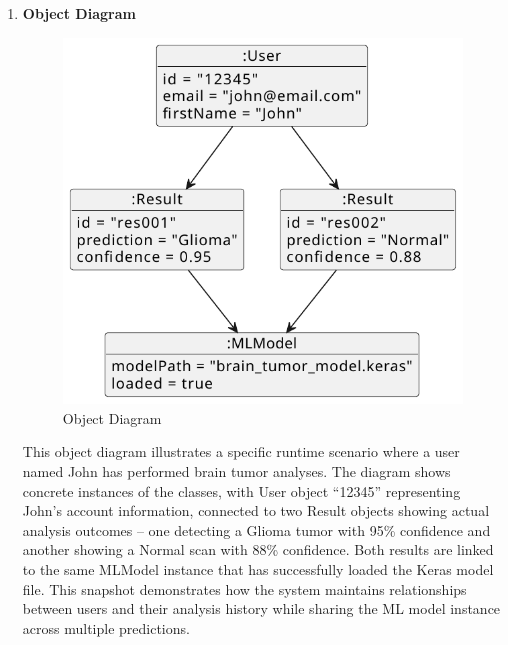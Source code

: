 \begin{enumerate}[label=\roman*.]
    \item \textbf{Object Diagram}
          \begin{center}
              \begin{figure}[H]
                  \centering
                  \includegraphics[width=0.60\linewidth]{Images/Highlevel/object.pdf}
                  \caption{Object Diagram}
                  \label{fig:ObjectDiagram}
              \end{figure}
          \end{center}
          This object diagram illustrates a specific runtime scenario where a user named John has performed brain tumor analyses. The diagram shows concrete instances of the classes, with User object ``12345'' representing John's account information, connected to two Result objects showing actual analysis outcomes -- one detecting a Glioma tumor with 95\% confidence and another showing a Normal scan with 88\% confidence. Both results are linked to the same MLModel instance that has successfully loaded the Keras model file. This snapshot demonstrates how the system maintains relationships between users and their analysis history while sharing the ML model instance across multiple predictions.


\end{enumerate}
